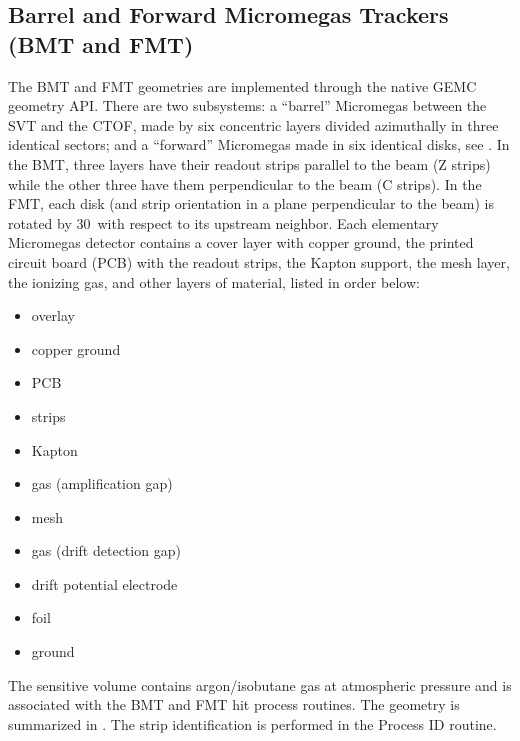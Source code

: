 \subsection{Barrel and Forward Micromegas Trackers (BMT and FMT)}

The BMT and FMT geometries are implemented through the native GEMC geometry API. There are two subsystems:
a ``barrel'' Micromegas between the SVT and the CTOF, made by six concentric layers divided azimuthally in three
identical sectors; and a ``forward'' Micromegas made in six identical disks, see . In the BMT, three
layers have their readout strips parallel to the beam (Z strips) while the other three have them perpendicular to the
beam (C strips). In the FMT, each disk (and strip orientation in a plane perpendicular to the beam) is rotated by
30\mdeg\ with respect to its upstream neighbor. Each elementary Micromegas detector contains a cover layer with
copper ground, the printed circuit board (PCB) with the readout strips, the Kapton support, the mesh layer, the ionizing
gas, and other layers of material, listed in order below:

\begin{itemize}
	\item overlay
	\item copper ground
	\item PCB
	\item strips
	\item Kapton
	\item gas (amplification gap)
	\item mesh
	\item gas (drift detection gap)
	\item drift potential electrode
	\item foil
	\item ground
\end{itemize}

The sensitive volume contains argon/isobutane gas at atmospheric pressure and is associated with the BMT and FMT hit
process routines. The geometry is summarized in . The strip identification is performed in the Process
ID routine.

